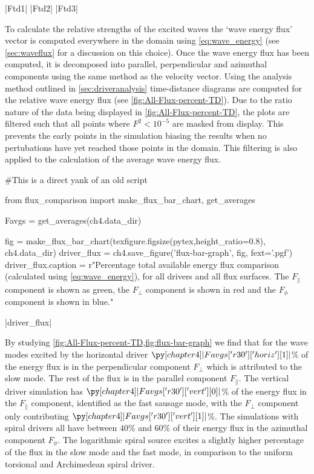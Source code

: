 \py[chapter4]|Ftd1|
\py[chapter4]|Ftd2|
\py[chapter4]|Ftd3|

To calculate the relative strengths of the excited waves the `wave energy flux' vector is computed everywhere in the domain using \cref{eq:wave_energy} (see \cref{sec:waveflux} for a discussion on this choice).
Once the wave energy flux has been computed, it is decomposed into parallel, perpendicular and azimuthal components using the same method as the velocity vector.
Using the analysis method outlined in \cref{sec:driveranalysis} time-distance diagrams are computed for the relative wave energy flux (see \cref{fig:All-Flux-percent-TD}).
Due to the ratio nature of the data being displayed in \cref{fig:All-Flux-percent-TD}, the plots are filtered such that all points where $F^2 < 10^{-5}$ are masked from display.
This prevents the early points in the simulation biasing the results when no pertubations have yet reached those points in the domain.
This filtering is also applied to the calculation of the average wave energy flux.


\begin{pycode}[chapter4]
#This is a direct yank of an old script

from flux_comparison import make_flux_bar_chart, get_averages

Favgs = get_averages(ch4.data_dir)

fig = make_flux_bar_chart(texfigure.figsize(pytex,height_ratio=0.8), ch4.data_dir)
driver_flux = ch4.save_figure('flux-bar-graph', fig, fext='.pgf')
driver_flux.caption = r"Percentage total available energy flux comparison (calculated using \cref{eq:wave_energy}), for all drivers and all flux surfaces. The $F_\parallel$ component is shown as green, the $F_\perp$ component is shown in red and the $F_\phi$ component is shown in blue."
\end{pycode}

\py[chapter4]|driver_flux|


By studying \cref{fig:All-Flux-percent-TD,fig:flux-bar-graph} we find that for the wave modes excited by the horizontal driver $\py[chapter4]|Favgs['r30']['horiz'][1]|$\% of the energy flux is in the perpendicular component $F_\perp$ which is attributed to the slow mode.
The rest of the flux is in the parallel component $F_\parallel$.
The vertical driver simulation has $\py[chapter4]|Favgs['r30']['vert'][0]|$\% of the energy flux in the $F_\parallel$ component, identified as the fast sausage mode, with the $F_\perp$ component only contributing $\py[chapter4]|Favgs['r30']['vert'][1]|$\%.
The simulations with spiral drivers all have between $40$\% and $60$\% of their energy flux in the azimuthal component $F_\phi$.
The logarithmic spiral source excites a slightly higher percentage of the flux in the slow mode and the fast mode, in comparison to the uniform torsional and Archimedean spiral driver.

